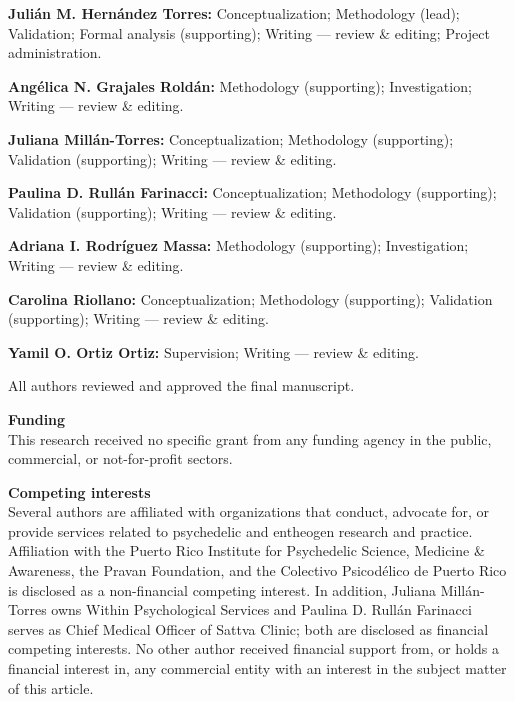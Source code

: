 \documentclass[12pt]{article}
\begin{document}
\noindent\textbf{Juli\'an M. Hern\'andez Torres:} Conceptualization; Methodology (lead); Validation;
Formal analysis (supporting); Writing --- review \& editing; Project administration.

\noindent\textbf{Ang\'elica N. Grajales Rold\'an:} Methodology (supporting); Investigation; Writing ---
review \& editing.

\noindent\textbf{Juliana Mill\'an-Torres:} Conceptualization; Methodology (supporting); Validation
(supporting); Writing --- review \& editing.

\noindent\textbf{Paulina D. Rull\'an Farinacci:} Conceptualization; Methodology (supporting); Validation
(supporting); Writing --- review \& editing.

\noindent\textbf{Adriana I. Rodr\'iguez Massa:} Methodology (supporting); Investigation; Writing ---
review \& editing.

\noindent\textbf{Carolina Riollano:} Conceptualization; Methodology (supporting); Validation
(supporting); Writing --- review \& editing.

\noindent\textbf{Yamil O. Ortiz Ortiz:} Supervision; Writing --- review \& editing.

\vspace{0.6em}
\noindent All authors reviewed and approved the final manuscript. 

\vspace{0.6em}

\vspace{1em}
\noindent\textbf{Funding}\\
This research received no specific grant from any funding agency in the public, commercial, or
not-for-profit sectors.

\vspace{1em}
\noindent\textbf{Competing interests}\\
Several authors are affiliated with organizations that conduct, advocate for, or provide services related
to psychedelic and entheogen research and practice. Affiliation with the Puerto Rico Institute for
Psychedelic Science, Medicine \& Awareness, the Pravan Foundation, and the Colectivo Psicod\'elico de
Puerto Rico is disclosed as a non-financial competing interest. In addition, Juliana Mill\'an-Torres owns
Within Psychological Services and Paulina D. Rull\'an Farinacci serves as Chief Medical Officer of Sattva
Clinic; both are disclosed as financial competing interests. No other author received financial support
from, or holds a financial interest in, any commercial entity with an interest in the subject matter of
this article.
\end{document}
